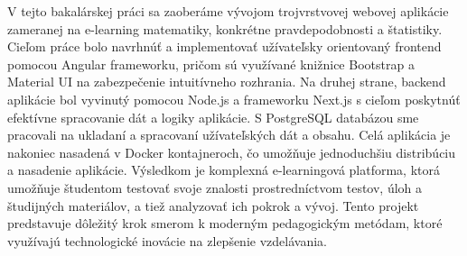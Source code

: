 V tejto bakalárskej práci sa zaoberáme vývojom trojvrstvovej webovej aplikácie
zameranej na e-learning matematiky, konkrétne pravdepodobnosti a štatistiky. Cieľom
práce bolo navrhnúť a implementovať užívateľsky orientovaný frontend pomocou
Angular frameworku, pričom sú využívané knižnice Bootstrap a Material UI na
zabezpečenie intuitívneho rozhrania. Na druhej strane, backend aplikácie bol vyvinutý
pomocou Node.js a frameworku Next.js s cieľom poskytnúť efektívne spracovanie dát
a logiky aplikácie. S PostgreSQL databázou sme pracovali na ukladaní a spracovaní
užívateľských dát a obsahu. Celá aplikácia je nakoniec nasadená v Docker
kontajneroch, čo umožňuje jednoduchšiu distribúciu a nasadenie aplikácie. Výsledkom
je komplexná e-learningová platforma, ktorá umožňuje študentom testovať svoje
znalosti prostredníctvom testov, úloh a študijných materiálov, a tiež analyzovať ich
pokrok a vývoj. Tento projekt predstavuje dôležitý krok smerom k moderným
pedagogickým metódam, ktoré využívajú technologické inovácie na zlepšenie
vzdelávania.